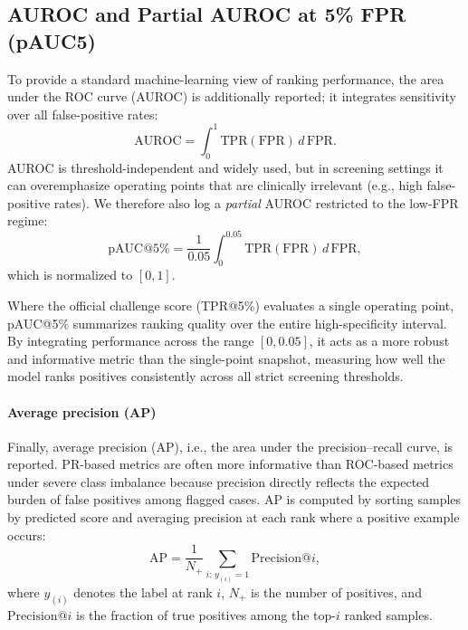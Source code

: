 \subsection{AUROC and Partial AUROC at 5\% FPR (pAUC5)}
To provide a standard machine-learning view of ranking performance, the area under the ROC curve (AUROC) is additionally reported; it integrates sensitivity over all false-positive rates:
\begin{equation}
  \mathrm{AUROC} = \int_{0}^{1} \mathrm{TPR}(\mathrm{FPR})\, d\,\mathrm{FPR}.
  \label{eq:auroc}
\end{equation}
AUROC is threshold-independent and widely used, but in screening settings it can overemphasize operating points that are clinically irrelevant (e.g., high false-positive rates).
We therefore also log a \emph{partial} AUROC restricted to the low-FPR regime:
\begin{equation}
  \mathrm{pAUC@5\%} = \frac{1}{0.05}\int_{0}^{0.05} \mathrm{TPR}(\mathrm{FPR})\, d\,\mathrm{FPR},
  \label{eq:pauc5}
\end{equation}
which is normalized to $[0,1]$.

Where the official challenge score (TPR@5\%) evaluates a single operating point, pAUC@5\% summarizes ranking quality over the entire high-specificity interval.
By integrating performance across the range $[0, 0.05]$, it acts as a more robust and informative metric than the single-point snapshot, measuring how well the model ranks positives consistently across all strict screening thresholds.

\paragraph*{Average precision (AP)}
Finally, average precision (AP), i.e., the area under the precision--recall curve, is reported.
PR-based metrics are often more informative than ROC-based metrics under severe class imbalance because precision directly reflects the expected burden of false positives among flagged cases.
AP is computed by sorting samples by predicted score and averaging precision at each rank where a positive example occurs:
\begin{equation}
  \mathrm{AP} = \frac{1}{N_{+}} \sum_{i:\,y_{(i)}=1} \mathrm{Precision@}i,
  \label{eq:ap}
\end{equation}
where $y_{(i)}$ denotes the label at rank $i$, $N_{+}$ is the number of positives, and $\mathrm{Precision@}i$ is the fraction of true positives among the top-$i$ ranked samples.
